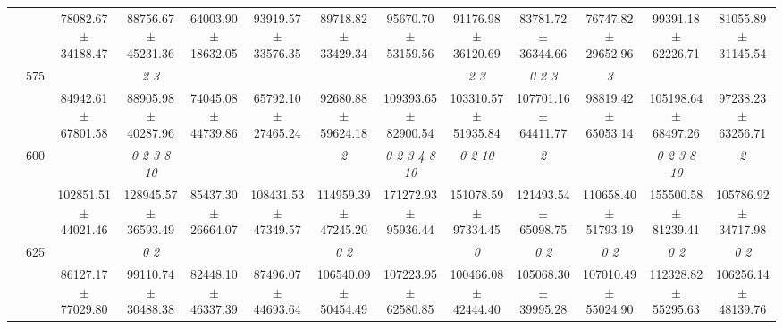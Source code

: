 \begin{table}[h]
{\begin{tabular}{
        ccccccccccccc}
 & & 78082.67 $\pm$ 34188.47& 88756.67 $\pm$ 45231.36& 64003.90 $\pm$ 18632.05& 93919.57 $\pm$ 33576.35& 89718.82 $\pm$ 33429.34& 95670.70 $\pm$ 53159.56& 91176.98 $\pm$ 36120.69& 83781.72 $\pm$ 36344.66& 76747.82 $\pm$ 29652.96& 99391.18 $\pm$ 62226.71& 81055.89 $\pm$ 31145.54 \\ 
 & \multirow{2}{*}{575}& \cellcolor[HTML]{EFEFEF} & \cellcolor[HTML]{EFEFEF} \textit{ 2 3 }& \cellcolor[HTML]{EFEFEF} & \cellcolor[HTML]{EFEFEF} & \cellcolor[HTML]{EFEFEF} & \cellcolor[HTML]{EFEFEF} & \cellcolor[HTML]{EFEFEF} \textit{ 2 3 }& \cellcolor[HTML]{EFEFEF} \textit{ 0 2 3 }& \cellcolor[HTML]{EFEFEF} \textit{ 3 }& \cellcolor[HTML]{EFEFEF} & \cellcolor[HTML]{EFEFEF}  \\ 
 & & \cellcolor[HTML]{EFEFEF} 84942.61 $\pm$ 67801.58& \cellcolor[HTML]{EFEFEF} 88905.98 $\pm$ 40287.96& \cellcolor[HTML]{EFEFEF} 74045.08 $\pm$ 44739.86& \cellcolor[HTML]{EFEFEF} 65792.10 $\pm$ 27465.24& \cellcolor[HTML]{EFEFEF} 92680.88 $\pm$ 59624.18& \cellcolor[HTML]{EFEFEF} 109393.65 $\pm$ 82900.54& \cellcolor[HTML]{EFEFEF} 103310.57 $\pm$ 51935.84& \cellcolor[HTML]{EFEFEF} 107701.16 $\pm$ 64411.77& \cellcolor[HTML]{EFEFEF} 98819.42 $\pm$ 65053.14& \cellcolor[HTML]{EFEFEF} 105198.64 $\pm$ 68497.26& \cellcolor[HTML]{EFEFEF} 97238.23 $\pm$ 63256.71 \\ 
 & \multirow{2}{*}{600}& & \textit{  0  2  3  8 10 }& & & \textit{ 2 }& \textit{  0  2  3  4  8 10 }& \textit{  0  2 10 }& \textit{ 2 }& & \textit{  0  2  3  8 10 }& \textit{ 2 } \\ 
 & & 102851.51 $\pm$ 44021.46& 128945.57 $\pm$ 36593.49& 85437.30 $\pm$ 26664.07& 108431.53 $\pm$ 47349.57& 114959.39 $\pm$ 47245.20& 171272.93 $\pm$ 95936.44& 151078.59 $\pm$ 97334.45& 121493.54 $\pm$ 65098.75& 110658.40 $\pm$ 51793.19& 155500.58 $\pm$ 81239.41& 105786.92 $\pm$ 34717.98 \\ 
 & \multirow{2}{*}{625}& \cellcolor[HTML]{EFEFEF} & \cellcolor[HTML]{EFEFEF} \textit{ 0 2 }& \cellcolor[HTML]{EFEFEF} & \cellcolor[HTML]{EFEFEF} & \cellcolor[HTML]{EFEFEF} \textit{ 0 2 }& \cellcolor[HTML]{EFEFEF} & \cellcolor[HTML]{EFEFEF} \textit{ 0 }& \cellcolor[HTML]{EFEFEF} \textit{ 0 2 }& \cellcolor[HTML]{EFEFEF} \textit{ 0 2 }& \cellcolor[HTML]{EFEFEF} \textit{ 0 2 }& \cellcolor[HTML]{EFEFEF} \textit{ 0 2 } \\ 
 & & \cellcolor[HTML]{EFEFEF} 86127.17 $\pm$ 77029.80& \cellcolor[HTML]{EFEFEF} 99110.74 $\pm$ 30488.38& \cellcolor[HTML]{EFEFEF} 82448.10 $\pm$ 46337.39& \cellcolor[HTML]{EFEFEF} 87496.07 $\pm$ 44693.64& \cellcolor[HTML]{EFEFEF} 106540.09 $\pm$ 50454.49& \cellcolor[HTML]{EFEFEF} 107223.95 $\pm$ 62580.85& \cellcolor[HTML]{EFEFEF} 100466.08 $\pm$ 42444.40& \cellcolor[HTML]{EFEFEF} 105068.30 $\pm$ 39995.28& \cellcolor[HTML]{EFEFEF} 107010.49 $\pm$ 55024.90& \cellcolor[HTML]{EFEFEF} 112328.82 $\pm$ 55295.63& \cellcolor[HTML]{EFEFEF} 106256.14 $\pm$ 48139.76 \\ 

\end{tabular}}
\end{table}
